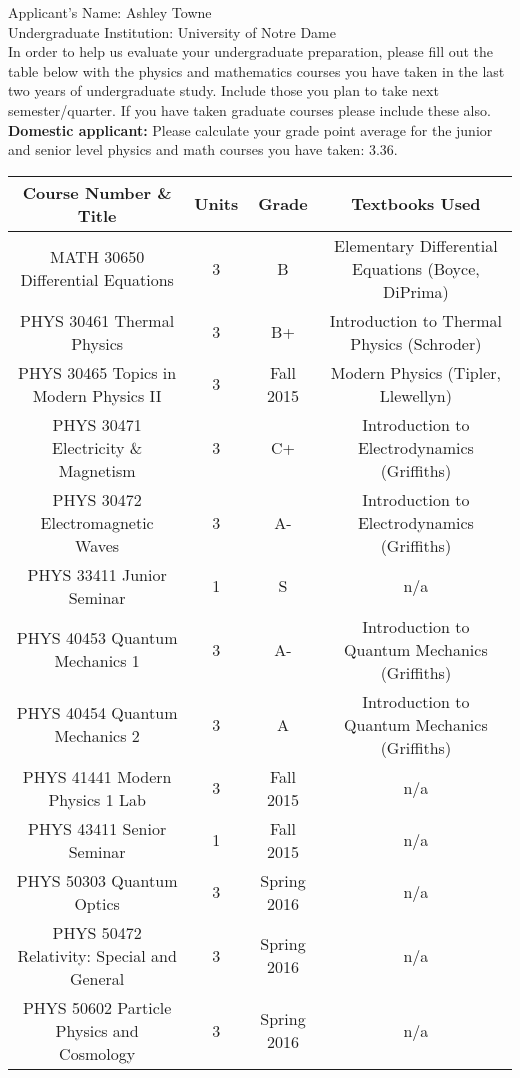 \documentclass[a4paper,10pt]{article}
\begin{document}

\begin{flushleft}
Applicant's Name: Ashley Towne\\

Undergraduate Institution: University of Notre Dame\\

In order to help us evaluate your undergraduate preparation, please fill out
the table below with the physics and mathematics courses you have taken in the
last two years of undergraduate study. Include those you plan to take next
semester/quarter. If you have taken graduate courses please include these
also.\\

\textbf{Domestic applicant:} Please calculate your grade point average for the
junior and senior level physics and math courses you have taken: 3.36.\\

\begin{tabular}{c|c|c|c}
    \textbf{Course Number \& Title} & \textbf{Units} & \textbf{Grade} & \textbf{Textbooks Used}\\
    \hline
    MATH 30650 Differential Equations & 3 & B & Elementary Differential Equations (Boyce, DiPrima)\\
    \hline
    PHYS 30461 Thermal Physics & 3 & B+ & Introduction to Thermal Physics (Schroder)\\
    \hline
    PHYS 30465 Topics in Modern Physics II & 3 & Fall 2015 & Modern Physics (Tipler, Llewellyn)\\
    \hline
    PHYS 30471 Electricity \& Magnetism & 3 & C+ & Introduction to Electrodynamics (Griffiths)\\
    \hline
    PHYS 30472 Electromagnetic Waves & 3 & A- & Introduction to Electrodynamics (Griffiths)\\
    \hline
    PHYS 33411 Junior Seminar & 1 & S & n/a\\
    \hline
    PHYS 40453 Quantum Mechanics 1 & 3 & A- & Introduction to Quantum Mechanics (Griffiths)\\
    \hline
    PHYS 40454 Quantum Mechanics 2 & 3 & A & Introduction to Quantum Mechanics (Griffiths)\\
    \hline
    PHYS 41441 Modern Physics 1 Lab & 3 & Fall 2015 & n/a\\
    \hline
    PHYS 43411 Senior Seminar & 1 & Fall 2015 & n/a\\
    \hline
    PHYS 50303 Quantum Optics & 3 & Spring 2016 & n/a\\
    \hline
    PHYS 50472 Relativity: Special and General & 3 & Spring 2016 & n/a\\
    \hline
    PHYS 50602 Particle Physics and Cosmology & 3 & Spring 2016 & n/a\\
\end{tabular}
\end{flushleft}
\end{document}
